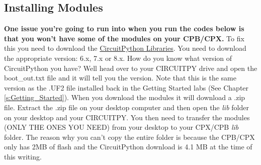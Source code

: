 \subsection{Installing Modules}

{\bf One issue you're going to run into when
you run the codes below is that you won't have some of the modules on
your CPB/CPX.} To fix this you need to download
the \href{https://circuitpython.org/libraries}{CircuitPython
Libraries}. You need to download the appropriate
version: 6.x, 7.x or 8.x. How do you know what version of CircuitPython
you have? Well head over to your CIRCUITPY drive and open the
boot\_out.txt file and it will tell you the version. Note that this is
the same version as the .UF2 file installed back in the Getting
Started labs (See Chapter \ref{s:Getting_Started}). When you download
the modules it will download a .zip file. Extract the .zip file on
your desktop computer and then open the {\it lib} folder on your
desktop and your CIRCUITPY. You then need to transfer the modules
(ONLY THE ONES YOU NEED) from your desktop to your CPX/CPB {\it lib} folder. The reason
why you can't copy the entire folder is because the CPB/CPX only has
2MB of flash and the CircuitPython download is 4.1 MB at the time of
this writing. 
